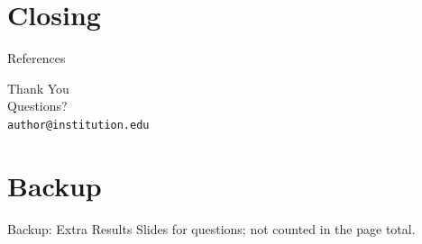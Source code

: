 \documentclass[aspectratio=169,10pt]{beamer}
\begin{document}
\section{Closing}

\begin{frame}{References}
  \footnotesize
  
  
\end{frame}

{
\begin{frame}[plain]
  \centering
  \vfill
  {\Huge Thank You}\\[10pt]
  Questions?\\[16pt]
  {\small \texttt{author@institution.edu}}
  \vfill
\end{frame}
}

\appendix
\section*{Backup}
\begin{frame}{Backup: Extra Results}
  Slides for questions; not counted in the page total.
\end{frame}
\end{document}
